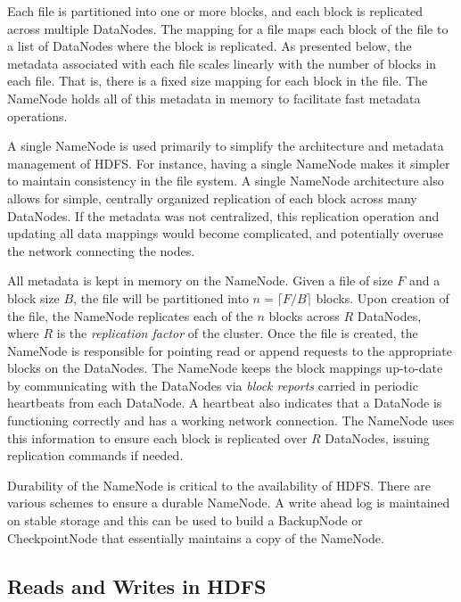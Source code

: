 \documentclass[11pt, a4paper]{article}
\begin{document}
\begin{multicols*}{2}
Each file is partitioned into one or more blocks, and each block is replicated across multiple DataNodes. The mapping for a file maps each block of the file to a list of DataNodes where the block is replicated. As presented below, the metadata associated with each file scales linearly with the number of blocks in each file. That is, there is a fixed size mapping for each block in the file. The NameNode holds all of this metadata in memory to facilitate fast metadata operations.

A single NameNode is used primarily to simplify the architecture and metadata management of HDFS. For instance, having a single NameNode makes it simpler to maintain consistency in the file system. A single NameNode architecture also allows for simple, centrally organized replication of each block across many DataNodes. If the metadata was not centralized, this replication operation and updating all data mappings would become complicated, and potentially overuse the network connecting the nodes.

All metadata is kept in memory on the NameNode. Given a file of size $F$ and a block size $B$, the file will be partitioned into $n = \lceil F/B\rceil$ blocks. Upon creation of the file, the NameNode replicates each of the $n$ blocks across $R$ DataNodes, where $R$ is the \textit{replication factor} of the cluster. Once the file is created, the NameNode is responsible for pointing read or append requests to the appropriate blocks on the DataNodes. The NameNode keeps the block mappings up-to-date by communicating with the DataNodes via \textit{block reports} carried in periodic heartbeats from each DataNode. A heartbeat also indicates that a DataNode is functioning correctly and has a working network connection. The NameNode uses this information to ensure each block is replicated over $R$ DataNodes, issuing replication commands if needed.

Durability of the NameNode is critical to the availability of HDFS. There are various schemes to ensure a durable NameNode. A write ahead log is maintained on stable storage and this can be used to build a BackupNode or CheckpointNode that essentially maintains a copy of the NameNode. 

\subsection{Reads and Writes in HDFS}


\end{multicols*}
\end{document}
